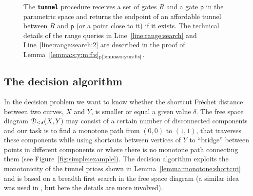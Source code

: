 \documentclass[12pt]{article}
\makeatletter
\newcommand{\AlgorithmI}[1]{{\textcolor[named]{RedViolet}{\texttt{\bf{#1}}}}}
\newcommand{\Algorithm}[1]{{\AlgorithmI{#1}\index{algorithm!#1@{\AlgorithmI{#1}}}}}
\newcommand{\seclab}[1]{\label{sec:#1}}
\newcommand{\lemref}[1]{Lemma~\ref{lemma:#1}}
\newcommand{\lemrefpage}[1]{Lemma~\ref{lemma:#1}$_\text{p\pageref{lemma:#1}}$}
\newcommand{\figlab}[1]{\label{fig:#1}}
\newcommand{\figref}[1]{Figure~\ref{fig:#1}}
\newcommand{\Frechet}{Fr\'{e}c{h}e{}t\xspace}\providecommand{\Arr}{\mathop{\mathrm{\EuScript{A}}}}
\newcommand{\Reached}{R}
\newcommand{\pnt}{\mathsf{p}}
\newcommand{\SimplifyX}[1]{#1}
\newcommand{\cXBase}{X} \newcommand{\cYBase}{Y} \newcommand{\crvCBase}{{\pi}}
\newcommand{\cX}{\SimplifyX{\cXBase}}
\newcommand{\cY}{\SimplifyX{\cYBase}}
\newcommand{\lineref}[1]{Line~\ref{line:#1}}
\newcommand{\FullFDleqC}{\EuScript{D}}
\newcommand{\FullFDleq}[1]{\FullFDleqC_{\leq #1}}
\newcommand{\tunnelTest}{\Algorithm{tunnel}\xspace}
\numberwithin{figure}{section}
\numberwithin{equation}{section}
\makeatother
\begin{document}
\begin{figure}[t]
\begin{center}
{\begin{minipage}{0.76\linewidth}
\begin{algorithmic}[1]
               \end{algorithmic}
           \end{minipage}}
    \end{center}\vspace{-0.5cm}\caption{The \tunnelTest procedure receives a set of gates $\Reached$
       and a gate $\pnt$ in the parametric space and returns the
       endpoint of an affordable tunnel between $\Reached$ and $\pnt$
       (or a point close to it) if it exists. The technical details of
       the range queries in \lineref{range:search} and
       \lineref{range:search:2} are described in the proof of
       \lemrefpage{s:y:m:f:s}.  }
    \figlab{tunnel:test}\end{figure}


\subsection{The decision algorithm}
\seclab{algo:decider}

In the decision problem we want to know whether the shortcut \Frechet
distance between two curves, $\cX$ and $\cY$, is smaller or equal a
given value $\delta$.  The free space diagram
$\FullFDleq{\delta}(\cX,\cY)$ may consist of a certain number of
disconnected components and our task is to find a monotone path from
$(0,0)$ to $(1,1)$, that traverses these components while using
shortcuts between vertices of $\cY$ to ``bridge'' between points in
different components or where there is no monotone path connecting
them (see \figref{simple:example}).  The decision algorithm exploits
the monotonicity of the tunnel prices shown in
\lemref{monotone:shortcut} and is based on a breadth first search in
the free space diagram (a similar idea was used
in \cite{dhw-afdrc-12}, but here the details are more involved).
\end{document}
